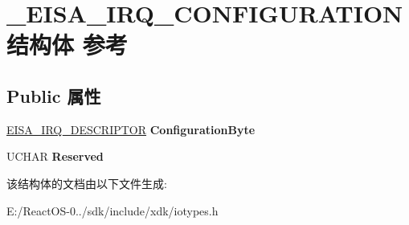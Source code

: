 \hypertarget{struct___e_i_s_a___i_r_q___c_o_n_f_i_g_u_r_a_t_i_o_n}{}\section{\+\_\+\+E\+I\+S\+A\+\_\+\+I\+R\+Q\+\_\+\+C\+O\+N\+F\+I\+G\+U\+R\+A\+T\+I\+O\+N结构体 参考}
\label{struct___e_i_s_a___i_r_q___c_o_n_f_i_g_u_r_a_t_i_o_n}
\subsection*{Public 属性}
\begin{DoxyCompactItemize}
\item 
\mbox{\label{struct___e_i_s_a___i_r_q___c_o_n_f_i_g_u_r_a_t_i_o_n_a5746b510254fa816d8e66b106579c756}} 
\hyperlink{struct___e_i_s_a___i_r_q___d_e_s_c_r_i_p_t_o_r}{E\+I\+S\+A\+\_\+\+I\+R\+Q\+\_\+\+D\+E\+S\+C\+R\+I\+P\+T\+OR} {\bfseries Configuration\+Byte}
\item 
\mbox{\label{struct___e_i_s_a___i_r_q___c_o_n_f_i_g_u_r_a_t_i_o_n_a911d3778d7b93a2487b830111ad76d59}} 
U\+C\+H\+AR {\bfseries Reserved}
\end{DoxyCompactItemize}


该结构体的文档由以下文件生成\+:\begin{DoxyCompactItemize}
\item 
E\+:/\+React\+O\+S-\/0../sdk/include/xdk/iotypes.\+h\end{DoxyCompactItemize}
